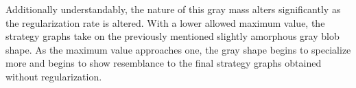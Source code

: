 Additionally understandably,
the nature of this gray mass alters significantly as the regularization rate is
altered.
%
With a lower allowed maximum value,
the strategy graphs take on the previously mentioned slightly amorphous gray
blob shape.
%
As the maximum value approaches one,
the gray shape begins to specialize more and begins to show resemblance to the
final strategy graphs obtained without regularization.


